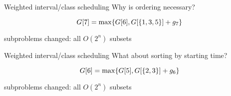 \begin{frame}{Weighted interval/class scheduling}
  Why is ordering necessary?

  \[
	G[7] = \max \{G[6], G[\{1,3,5\}] + g_{7}\}
  \]

  \begin{center}
	subproblems changed: all $O(2^{n})$ subsets
  \end{center}
\end{frame}
\begin{frame}{Weighted interval/class scheduling}
  What about sorting by starting time?

  \[
	G[6] = \max \{G[5], G[\{2,3\}] + g_{6}\}
  \]

  \begin{center}
	subproblems changed: all $O(2^{n})$ subsets
  \end{center}
\end{frame}
